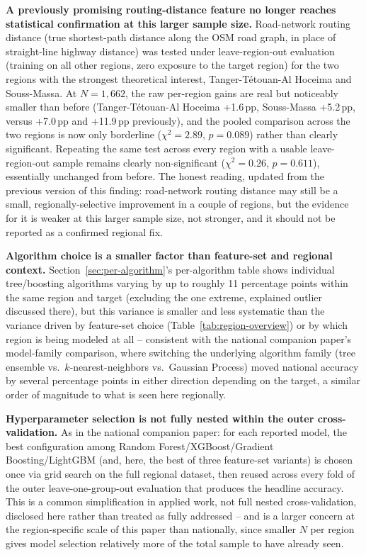 \documentclass[11pt,a4paper]{article}
\begin{document}
\textbf{A previously promising routing-distance feature no longer reaches statistical confirmation at this larger sample size.} Road-network routing distance (true shortest-path distance along the OSM road graph, in place of straight-line highway distance) was tested under leave-region-out evaluation (training on all other regions, zero exposure to the target region) for the two regions with the strongest theoretical interest, Tanger-Tétouan-Al Hoceima and Souss-Massa. At $N=1{,}662$, the raw per-region gains are real but noticeably smaller than before (Tanger-Tétouan-Al Hoceima +1.6\,pp, Souss-Massa +5.2\,pp, versus +7.0\,pp and +11.9\,pp previously), and the pooled comparison across the two regions is now only borderline ($\chi^2=2.89$, $p=0.089$) rather than clearly significant. Repeating the same test across every region with a usable leave-region-out sample remains clearly non-significant ($\chi^2=0.26$, $p=0.611$), essentially unchanged from before. The honest reading, updated from the previous version of this finding: road-network routing distance may still be a small, regionally-selective improvement in a couple of regions, but the evidence for it is weaker at this larger sample size, not stronger, and it should not be reported as a confirmed regional fix.

\textbf{Algorithm choice is a smaller factor than feature-set and regional context.} Section~\ref{sec:per-algorithm}'s per-algorithm table shows individual tree/boosting algorithms varying by up to roughly 11 percentage points within the same region and target (excluding the one extreme, explained outlier discussed there), but this variance is smaller and less systematic than the variance driven by feature-set choice (Table~\ref{tab:region-overview}) or by which region is being modeled at all -- consistent with the national companion paper's model-family comparison, where switching the underlying algorithm family (tree ensemble vs.\ $k$-nearest-neighbors vs.\ Gaussian Process) moved national accuracy by several percentage points in either direction depending on the target, a similar order of magnitude to what is seen here regionally.

\textbf{Hyperparameter selection is not fully nested within the outer cross-validation.} As in the national companion paper: for each reported model, the best configuration among Random Forest/XGBoost/Gradient Boosting/LightGBM (and, here, the best of three feature-set variants) is chosen once via grid search on the full regional dataset, then reused across every fold of the outer leave-one-group-out evaluation that produces the headline accuracy. This is a common simplification in applied work, not full nested cross-validation, disclosed here rather than treated as fully addressed -- and is a larger concern at the region-specific scale of this paper than nationally, since smaller $N$ per region gives model selection relatively more of the total sample to have already seen.
\end{document}
